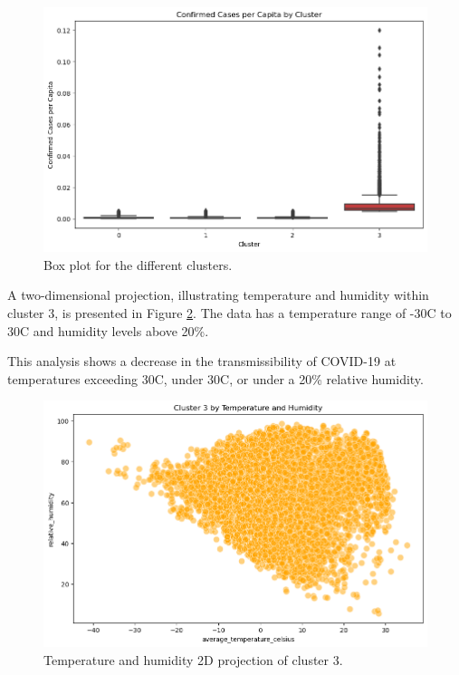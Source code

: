 \documentclass[sigconf,screen,nonacm]{acmart}
\begin{document}
\begin{figure}[H]
  \centering
  \includegraphics[width=\linewidth]{Figures/confirmedPerCluster.png}
  \caption{Box plot for the different clusters.}
  \label{fig:confirmedPerCluster}
\end{figure}


A two-dimensional projection, illustrating temperature and humidity within cluster 3, is presented in Figure \ref{fig:2D-cluster}. The data has a temperature range of -30\textdegree{}C to 30\textdegree{}C and humidity levels above 20\%. 

This analysis shows a decrease in the transmissibility of COVID-19 at temperatures exceeding 30\textdegree{}C, under 30\textdegree{}C, or under a 20\% relative humidity.



\begin{figure}[H]
  \centering
  \includegraphics[width=\linewidth]{Figures/Cluster3-2D.PNG}
  \caption{Temperature and humidity 2D projection of cluster 3.}
  \label{fig:2D-cluster}
\end{figure}
\end{document}
